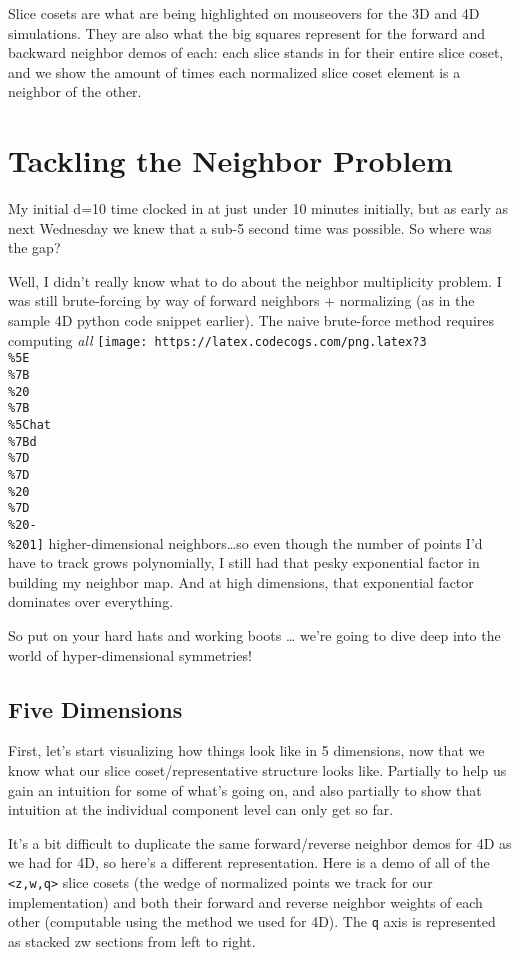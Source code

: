 \documentclass[]{article}
\begin{document}
\begin{itemize}
  Slice cosets are what are being highlighted on mouseovers for the 3D and 4D
  simulations. They are also what the big squares represent for the forward and
  backward neighbor demos of each: each slice stands in for their entire slice
  coset, and we show the amount of times each normalized slice coset element is
  a neighbor of the other.
\end{itemize}

\hypertarget{tackling-the-neighbor-problem}{%
\section{Tackling the Neighbor Problem}\label{tackling-the-neighbor-problem}}

My initial d=10 time clocked in at just under 10 minutes initially, but as early
as next Wednesday we knew that a sub-5 second time was possible. So where was
the gap?

Well, I didn't really know what to do about the neighbor multiplicity problem. I
was still brute-forcing by way of forward neighbors + normalizing (as in the
sample 4D python code snippet earlier). The naive brute-force method requires
computing \emph{all}
\texttt{[image: https://latex.codecogs.com/png.latex?3\\\%5E\\\%7B\\\%20\\\%7B\\\%5Chat\\\%7Bd\\\%7D\\\%7D\\\%20\\\%7D\\\%20-\\\%201]}
higher-dimensional neighbors\ldots so even though the number of points I'd have
to track grows polynomially, I still had that pesky exponential factor in
building my neighbor map. And at high dimensions, that exponential factor
dominates over everything.

So put on your hard hats and working boots \ldots{} we're going to dive deep
into the world of hyper-dimensional symmetries!

\hypertarget{five-dimensions}{%
\subsection{Five Dimensions}\label{five-dimensions}}

First, let's start visualizing how things look like in 5 dimensions, now that we
know what our slice coset/representative structure looks like. Partially to help
us gain an intuition for some of what's going on, and also partially to show
that intuition at the individual component level can only get so far.

It's a bit difficult to duplicate the same forward/reverse neighbor demos for 4D
as we had for 4D, so here's a different representation. Here is a demo of all of
the \texttt{\textless{}z,w,q\textgreater{}} slice cosets (the wedge of
normalized points we track for our implementation) and both their forward and
reverse neighbor weights of each other (computable using the method we used for
4D). The \texttt{q} axis is represented as stacked zw sections from left to
right.
\end{document}
